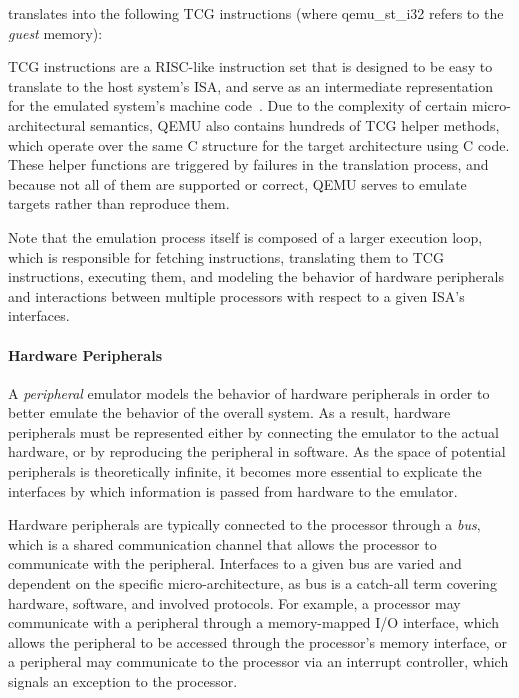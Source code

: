 \noindent
translates into the following TCG instructions (where qemu\_st\_i32 refers to the \emph{guest} memory):

\begin{center}

\end{center}

TCG instructions are a RISC-like instruction set that is designed to be easy to translate to the host system's ISA, and serve as an intermediate representation for the emulated system's machine code~\cite{tcg}.
Due to the complexity of certain micro-architectural semantics, QEMU also contains hundreds of TCG helper methods, which operate over the same C structure for the target architecture using C code.
These helper functions are triggered by failures in the translation process, and because not all of them are supported or correct, QEMU serves to emulate targets rather than reproduce them.

Note that the emulation process itself is composed of a larger execution loop, which is responsible for fetching instructions, translating them to TCG instructions, executing them, and modeling the behavior of hardware peripherals and interactions between multiple processors with respect to a given ISA's interfaces.

\paragraph{Hardware Peripherals}
\label{sec:periphs}

A \emph{peripheral} emulator models the behavior of hardware peripherals in order to better emulate the behavior of the overall system.
As a result, hardware peripherals must be represented either by connecting the emulator to the actual hardware, or by reproducing the peripheral in software.
As the space of potential peripherals is theoretically infinite, it becomes more essential to explicate the interfaces by which information is passed from hardware to the emulator.

Hardware peripherals are typically connected to the processor through a \emph{bus}, which is a shared communication channel that allows the processor to communicate with the peripheral.
Interfaces to a given bus are varied and dependent on the specific micro-architecture, as bus is a catch-all term covering hardware, software, and involved protocols.
For example, a processor may communicate with a peripheral through a memory-mapped I/O interface, which allows the peripheral to be accessed through the processor's memory interface, or a peripheral may communicate to the processor via an interrupt controller, which signals an exception to the processor.

